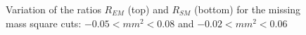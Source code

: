 \begin{figure}[h]
\begin{center}
  \caption{ Variation of the ratios $R_{EM}$ (top) and $R_{SM}$ (bottom) for the missing mass square cuts:
           $-0.05 < mm^2 < 0.08$ and $-0.02 < mm^2 < 0.06$ }
  \label{fig:ratios_mm_syst}
 \end{center}
\end{figure} 






